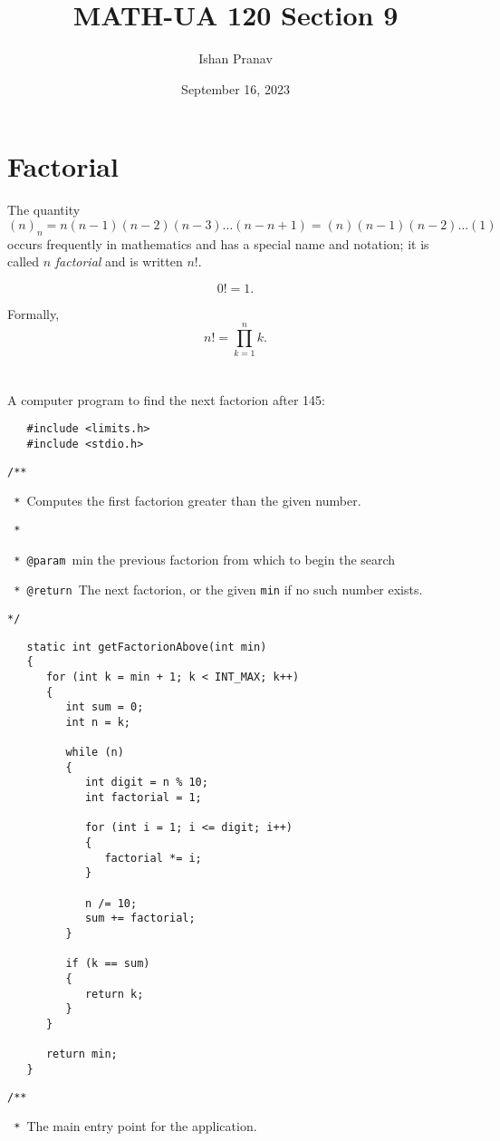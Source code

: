 \documentclass[12pt]{article}
\title{MATH-UA 120 Section 9}
\author{Ishan Pranav}
\date{September 16, 2023}
\begin{document}
\maketitle
\section*{Factorial}
The quantity
\[(n)_n=n(n-1)(n-2)(n-3)\dots(n-n+1)=(n)(n-1)(n-2)\dots(1)\]
occurs frequently in mathematics and has a special name and notation; it is called $n$ \textit{factorial} and is written $n!$.

\[0!=1.\]

Formally,
\[n!=\prod_{k=1}^{n}{k}.\]
\section{}
A computer program to find the next factorion after 145: 

\begin{verbatim}
   #include <limits.h>
   #include <stdio.h>
\end{verbatim}

\verb|/**|

\verb| * |Computes the first factorion greater than the given number.

\verb| * |

\verb| * @param |min the previous factorion from which to begin the search

\verb| * @return |The next factorion, or the given \verb|min| if no such number exists.

\verb|*/|
\begin{verbatim}
   static int getFactorionAbove(int min)
   {
      for (int k = min + 1; k < INT_MAX; k++)
      {
         int sum = 0;
         int n = k;
    
         while (n)
         {
            int digit = n % 10;
            int factorial = 1;
    
            for (int i = 1; i <= digit; i++)
            {
               factorial *= i;
            }
    
            n /= 10;
            sum += factorial;
         }
    
         if (k == sum)
         {
            return k;
         }
      }
    
      return min;
   }
\end{verbatim}

\verb|/**|

\verb| * |The main entry point for the application.
\end{document}
